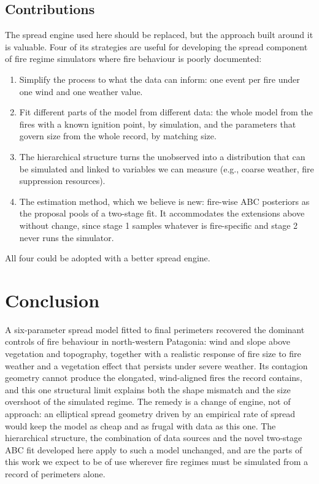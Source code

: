 \documentclass[ResearchPaper,linenum]{CSIRO_LaTeX_Template}
\begin{document}
\subsection*{Contributions}

The spread engine used here should be replaced, but the approach built around it is valuable.
Four of its strategies are useful for developing the spread component
of fire regime simulators where fire behaviour is poorly documented:

\begin{enumerate}
\item Simplify the process to what the data can inform: one event per fire under one
wind and one weather value.

\item Fit different parts of the model from different data: the whole model from the
fires with a known ignition point, by simulation, and the parameters that govern size
from the whole record, by matching size.

\item The hierarchical structure turns the unobserved into a distribution that can be
simulated and linked to variables we can measure (e.g., coarse weather, fire suppression
resources).

\item The estimation method, which we believe is new: fire-wise ABC posteriors as the
proposal pools of a two-stage fit. It accommodates the extensions above without change,
since stage 1 samples whatever is fire-specific and stage 2 never runs the simulator.
\end{enumerate}

\noindent All four could be adopted with a better spread engine.

\section{Conclusion}

A six-parameter spread model fitted to final perimeters recovered the dominant
controls of fire behaviour in north-western Patagonia: wind and slope above vegetation
and topography, together with a realistic response of fire size to fire weather and a
vegetation effect that persists under severe weather. Its contagion geometry cannot
produce the elongated, wind-aligned fires the record contains, and this one structural
limit explains both the shape mismatch and the size overshoot of the simulated regime.
The remedy is a change of engine, not of approach: an elliptical spread geometry driven
by an empirical rate of spread would keep the model as cheap and as frugal with data as
this one. The hierarchical structure, the combination of data sources and the novel
two-stage ABC fit developed here apply to such a model unchanged, and are the parts of this work
we expect to be of use wherever fire regimes must be simulated from a record of
perimeters alone.
\end{document}
